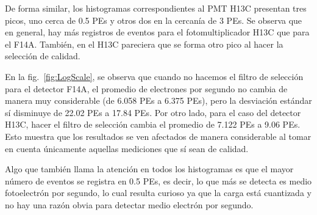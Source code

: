 \documentclass[11pt]{article}
\begin{document}
\hspace{5mm}De forma similar, los histogramas correspondientes al PMT H13C presentan tres picos, uno cerca de 0.5 PEs y otros dos en la cercanía de 3 PEs. Se observa que en general, hay más registros de eventos para el fotomultiplicador H13C que para el F14A. También, en el H13C pareciera que se forma otro pico al hacer la selección de calidad.

\hspace{5mm}En la fig.\ \ref{fig:LogScale}, se observa que cuando no hacemos el filtro de selección para el detector F14A, el promedio de electrones por segundo no cambia de manera muy considerable (de 6.058 PEs a 6.375 PEs), pero la desviación estándar sí disminuye de 22.02 PEs a 17.84 PEs. Por otro lado, para el caso del detector H13C, hacer el filtro de selección cambia el promedio de 7.122 PEs a 9.06 PEs. Esto muestra que los resultados se ven afectados de manera considerable al tomar en cuenta únicamente aquellas mediciones que sí sean de calidad.

\hspace{5mm}Algo que también llama la atención en todos los histogramas es que el mayor número de eventos se registra en 0.5 PEs, es decir, lo que más se detecta es medio fotoelectrón por segundo, lo cual resulta curioso ya que la carga está cuantizada y no hay una razón obvia para detectar medio electrón por segundo.  
\end{document}
